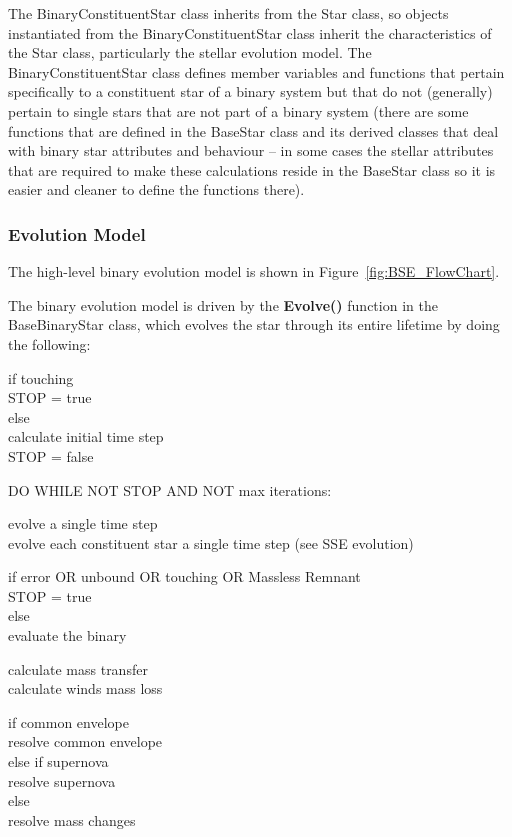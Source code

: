 The BinaryConstituentStar class inherits from the Star class, so objects instantiated from the BinaryConstituentStar class inherit the characteristics of the Star class, particularly the stellar evolution model.  The BinaryConstituentStar class defines member variables and functions that pertain specifically to a constituent star of a binary system but that do not (generally) pertain to single stars that are not part of a binary system (there are some functions that are defined in the BaseStar class and its derived classes that deal with binary star attributes and behaviour -- in some cases the stellar attributes that are required to make these calculations reside in the BaseStar class so it is easier and cleaner to define the functions there).


\newpage
\subsubsection{Evolution Model}\label{sec:BSE_EvolutionModel} 

The high-level binary evolution model is shown in Figure~\ref{fig:BSE_FlowChart}.

The binary evolution model is driven by the \textbf{Evolve()} function in the BaseBinaryStar class, which evolves the star through its entire lifetime by doing the following:

\bigskip
if touching \\
\tabto{3em} STOP = true \\
else \\
\tabto{3em}calculate initial time step \\
\tabto{3em}STOP = false

\medskip
DO WHILE NOT STOP AND NOT max iterations:

\tabto{3em}evolve a single time step \\
\tabto{5em}evolve each constituent star a single time step (see SSE evolution)

\tabto{3em}if error OR unbound OR touching OR Massless Remnant \\
\tabto{5em}STOP = true \\
\tabto{3em}else \\
\tabto{5em}evaluate the binary

\tabto{7em}calculate mass transfer \\
\tabto{7em}calculate winds mass loss

\tabto{7em}if common envelope \\
\tabto{9em}resolve common envelope \\
\tabto{7em}else if supernova \\
\tabto{9em}resolve supernova \\
\tabto{7em}else \\
\tabto{9em}resolve mass changes

